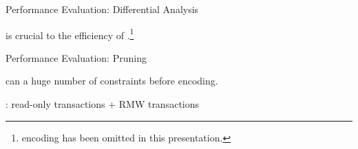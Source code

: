 \begin{frame}{Performance Evaluation: Differential Analysis}
	\begin{center}
		 is crucial to the efficiency of \polysi.\footnote{
			 encoding has been omitted in this presentation.
		}

		\vspace{0.30cm}
	\end{center}
\end{frame}

\begin{frame}{Performance Evaluation: Pruning}
	\begin{center}
		\polysi{} can  a huge number of constraints before encoding.

		\vspace{0.30cm}
		
		\vspace{0.30cm}

		: read-only transactions + RMW transactions
	\end{center}
\end{frame}
